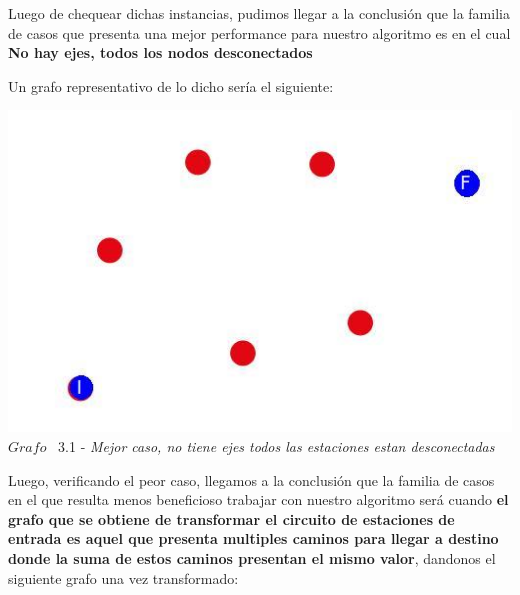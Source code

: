 Luego de chequear dichas instancias, pudimos llegar a la conclusi\'on que la familia de casos que presenta una mejor performance para nuestro algoritmo
es en el cual \textbf{No hay ejes, todos los nodos desconectados}

Un grafo representativo de lo dicho ser\'ia el siguiente:

\vspace*{0.3cm} \vspace*{0.3cm}
  \begin{center}
\includegraphics[scale=0.5]{./EJ3/grafoSinEjes.jpeg}
\\{$Grafo$ \ 3.1 - \textit{Mejor caso, no tiene ejes todos las estaciones estan desconectadas}} 
  \end{center}
  \vspace*{0.3cm}
  
Luego, verificando el peor caso, llegamos a la conclusi\'on que la familia de casos en el que resulta menos beneficioso trabajar con nuestro algoritmo ser\'a cuando \textbf{el grafo que se obtiene de transformar el circuito de estaciones de entrada es aquel que presenta multiples caminos para llegar a destino donde la suma de estos caminos presentan el mismo valor}, dandonos el siguiente grafo una vez transformado:\\


